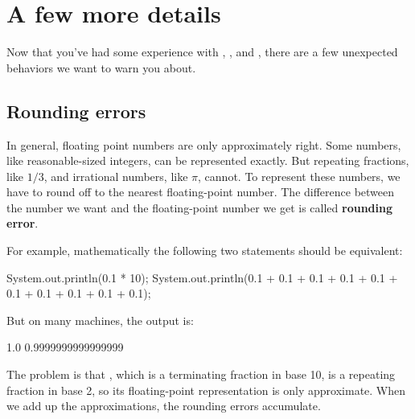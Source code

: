 \section{A few more details}

Now that you've had some experience with , , and , there are a few unexpected behaviors we want to warn you about.

\subsection{Rounding errors}



In general, floating point numbers are only approximately right.
Some numbers, like reasonable-sized integers, can be represented exactly.  
But repeating fractions, like $1/3$, and irrational numbers, like $\pi$, cannot.
To represent these numbers, we have to round off to the nearest floating-point number.
The difference between the number we want and the floating-point number we get is called {\bf rounding error}.


For example, mathematically the following two statements should be equivalent:

\begin{code}
    System.out.println(0.1 * 10);
    System.out.println(0.1 + 0.1 + 0.1 + 0.1 + 0.1
                     + 0.1 + 0.1 + 0.1 + 0.1 + 0.1);
\end{code}

But on many machines, the output is:

\begin{stdout}
    1.0
    0.9999999999999999
\end{stdout}

The problem is that , which is a terminating fraction in base 10, is a repeating fraction in base 2, so its floating-point representation is only approximate.
When we add up the approximations, the rounding errors accumulate.

